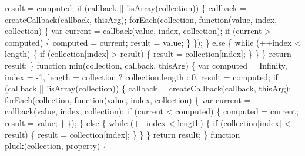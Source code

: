 \begin{DoxyCodeInclude}
{{\textcolor{stringliteral}{        result = computed;}
\textcolor{stringliteral}{}
\textcolor{stringliteral}{    if (callback || !isArray(collection)) \{}
\textcolor{stringliteral}{      callback = createCallback(callback, thisArg);}
\textcolor{stringliteral}{}
\textcolor{stringliteral}{      forEach(collection, function(value, index, collection) \{}
\textcolor{stringliteral}{        var current = callback(value, index, collection);}
\textcolor{stringliteral}{        if (current > computed) \{}
\textcolor{stringliteral}{          computed = current;}
\textcolor{stringliteral}{          result = value;}
\textcolor{stringliteral}{        \}}
\textcolor{stringliteral}{      \});}
\textcolor{stringliteral}{    \} else \{}
\textcolor{stringliteral}{      while (++index < length) \{}
\textcolor{stringliteral}{        if (collection[index] > result) \{}
\textcolor{stringliteral}{          result = collection[index];}
\textcolor{stringliteral}{        \}}
\textcolor{stringliteral}{      \}}
\textcolor{stringliteral}{    \}}
\textcolor{stringliteral}{    return result;}
\textcolor{stringliteral}{  \}}
\textcolor{stringliteral}{}
\textcolor{stringliteral}{  function min(collection, callback, thisArg) \{}
\textcolor{stringliteral}{    var computed = Infinity,}
\textcolor{stringliteral}{        index = -1,}
\textcolor{stringliteral}{        length = collection ? collection.length : 0,}
\textcolor{stringliteral}{        result = computed;}
\textcolor{stringliteral}{}
\textcolor{stringliteral}{    if (callback || !isArray(collection)) \{}
\textcolor{stringliteral}{      callback = createCallback(callback, thisArg);}
\textcolor{stringliteral}{}
\textcolor{stringliteral}{      forEach(collection, function(value, index, collection) \{}
\textcolor{stringliteral}{        var current = callback(value, index, collection);}
\textcolor{stringliteral}{        if (current < computed) \{}
\textcolor{stringliteral}{          computed = current;}
\textcolor{stringliteral}{          result = value;}
\textcolor{stringliteral}{        \}}
\textcolor{stringliteral}{      \});}
\textcolor{stringliteral}{    \} else \{}
\textcolor{stringliteral}{      while (++index < length) \{}
\textcolor{stringliteral}{        if (collection[index] < result) \{}
\textcolor{stringliteral}{          result = collection[index];}
\textcolor{stringliteral}{        \}}
\textcolor{stringliteral}{      \}}
\textcolor{stringliteral}{    \}}
\textcolor{stringliteral}{    return result;}
\textcolor{stringliteral}{  \}}
\textcolor{stringliteral}{}
\textcolor{stringliteral}{  function pluck(collection, property) \{}
}}
\end{DoxyCodeInclude}
